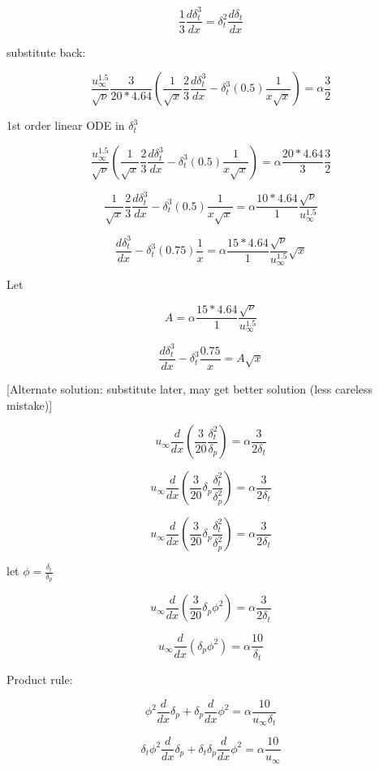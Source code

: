 \documentclass[11pt]{article}
\begin{document}
$$ \frac{1}{3} \frac{d \delta_t^3}{dx} =  \delta_t^2 \frac{d \delta_t}{dx}$$


substitute back:

$$  \frac{u_\infty^{1.5}}{\sqrt{\nu}} \frac{3}{20*4.64} (\frac{1}{\sqrt{x}}\frac{2}{3} \frac{d \delta_t^3}{dx} - \delta_t^3 (0.5) \frac{1}{x\sqrt{x}})  = \alpha \frac{3}{2}$$ 

1st order linear ODE in $\delta_t^3$

$$  \frac{u_\infty^{1.5}}{\sqrt{\nu}} (\frac{1}{\sqrt{x}}\frac{2}{3} \frac{d \delta_t^3}{dx} - \delta_t^3 (0.5) \frac{1}{x\sqrt{x}})  =  \alpha \frac{20*4.64}{3}  \frac{3}{2}$$ 

$$  \frac{1}{\sqrt{x}}\frac{2}{3} \frac{d \delta_t^3}{dx} - \delta_t^3 (0.5) \frac{1}{x\sqrt{x}}  =  \alpha \frac{10*4.64}{1} \frac{\sqrt{\nu}}{u_\infty^{1.5}} $$ 

$$  \frac{d \delta_t^3}{dx} - \delta_t^3 (0.75) \frac{1}{x}  =  \alpha \frac{15*4.64}{1} \frac{\sqrt{\nu}}{u_\infty^{1.5}} \sqrt{x} $$ 

Let 

$$A = \alpha \frac{15*4.64}{1} \frac{\sqrt{\nu}}{u_\infty^{1.5}} $$

$$  \frac{d \delta_t^3}{dx} - \delta_t^3  \frac{0.75}{x}  =  A \sqrt{x} $$ 




[Alternate solution: substitute later, may get better solution (less careless mistake)]

$$ u_\infty \frac{d}{dx} \left(  \frac{3}{20} \frac{\delta_t^2}{\delta_p}   \right)  = \alpha \frac{3}{2\delta_t}$$ 

$$ u_\infty \frac{d}{dx} \left(  \frac{3}{20} \delta_p \frac{\delta_t^2}{\delta_p^2}   \right)  = \alpha \frac{3}{2\delta_t}$$ 

$$ u_\infty \frac{d}{dx} \left(  \frac{3}{20} \delta_p \frac{\delta_t^2}{\delta_p^2}   \right)  = \alpha \frac{3}{2\delta_t}$$ 

let $\phi= \frac{\delta_t}{\delta_p}$

$$ u_\infty \frac{d}{dx} \left(  \frac{3}{20} \delta_p \phi^2 \right)  = \alpha \frac{3}{2\delta_t}$$ 

$$ u_\infty \frac{d}{dx} \left(  \delta_p \phi^2 \right)  = \alpha \frac{10}{\delta_t}$$ 


Product rule:

$$ \phi^2 \frac{d}{dx} \delta_p  + \delta_p \frac{d}{dx} \phi^2  = \alpha \frac{10}{  u_\infty \delta_t}$$ 

$$ \delta_t \phi^2 \frac{d}{dx} \delta_p  + \delta_t \delta_p \frac{d}{dx} \phi^2  = \alpha \frac{10}{  u_\infty }$$ 
\end{document}

